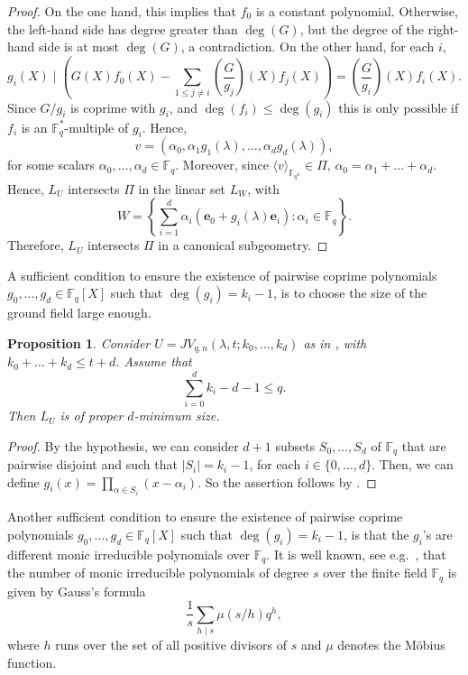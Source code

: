 \documentclass[11pt]{article}
\newtheorem{proposition}[theorem]{Proposition}
\theoremstyle{definition}
\newcommand{\fqn}{\mathbb{F}_{q^n}}
\newcommand{\F}{{\mathbb F}}
\newcommand{\fq}{{\mathbb F}_{q}}
\newcommand{\e}{\mathbf e}
\begin{document}
\begin{proof}
On the one hand, this implies that $f_0$ is a constant polynomial.
Otherwise, the left-hand side has degree greater than $\deg(G)$, but the degree of the right-hand side is at most $\deg(G)$, a contradiction.
On the other hand, for each $i$,
\[
 g_i(X) \mid \left( G(X) f_0(X) - \sum_{1 \leq j \neq i} \left(\frac G {g_j} \right) (X) f_j(X) \right) = \left(\frac G {g_i}\right)(X) f_i(X).
\]
Since $G/g_i$ is coprime with $g_i$, and $\deg(f_i) \leq \deg (g_i)$ this is only possible if $f_i$ is an {$\F_q^*$}-multiple of $g_i$.
Hence,
\[
 v = (\alpha_0, \alpha_1 g_1(\lambda), \dots, \alpha_d g_d(\lambda)),
\]
for some scalars $\alpha_0, \dots, \alpha_d \in \fq$.
Moreover, since $\langle v \rangle_{\fqn} \in \Pi$, $\alpha_0 = \alpha_1 + \ldots + \alpha_d$.
Hence, $L_U$ intersects $\Pi$ in the linear set $L_W$, with
\[
 W = \left\{ \sum_{i=1}^d \alpha_i (\e_0 + g_i(\lambda) \e_i) \colon \alpha_i \in \fq \right\}.
\]
Therefore, $L_U$ intersects $\Pi$ in a canonical subgeometry.
\end{proof}


A sufficient condition to ensure the existence of pairwise coprime polynomials $g_0,\ldots,g_{d} \in \F_q[X]$ such that $\deg(g_i)=k_i-1$, is to choose the size of the ground field large enough. 

\begin{proposition}
    Consider $U = JV_{q,n}(\lambda,t;k_0,\dots,k_d)$ as in , with $k_0 + \ldots + k_d \leq t+d$.
Assume that 
\[
\sum_{i=0}^d k_i-d-1 \leq q.
\]
Then $L_U$ is of proper $d$-minimum size.
\end{proposition}
\begin{proof}
    By the hypothesis, we can consider $d+1$ subsets $S_0,\ldots,S_{d}$ of $\F_q$ that are pairwise disjoint and such that $\lvert S_i \rvert=k_i-1$, for each $i \in \{0,\ldots,d\}$. Then, we can define $g_i(x)=\prod_{\alpha \in S_i}(x-\alpha_i)$. So the assertion follows by .
\end{proof}

Another sufficient condition to ensure the existence of pairwise coprime polynomials $g_0,\ldots,g_{d} \in \F_q[X]$ such that $\deg(g_i)=k_i-1$, is that the $g_i$'s are different monic irreducible polynomials over $\F_q$.
It is well known, see e.g.\ \cite[Theorem 3.25]{lidl1997finite}, that the number of monic irreducible polynomials of degree $s$ over the finite field $\F_q$ is given by Gauss’s formula 
\[
\frac{1}{s} \sum_{h \mid s} \mu (s/h)q^h,
\]
where $h$ runs over the set of all positive divisors of $s$ and $\mu$ denotes the Möbius function.
\end{document}
